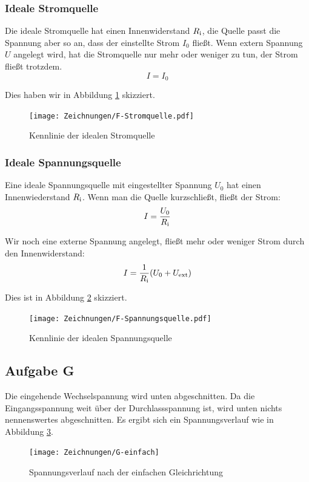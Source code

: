 \subsubsection{Ideale Stromquelle}

Die ideale Stromquelle hat einen Innenwiderstand $R_\text i$, die Quelle passt
die Spannung aber so an, dass der einstellte Strom $I_0$ fließt. Wenn extern
Spannung $U$ angelegt wird, hat die Stromquelle nur mehr oder weniger zu tun,
der Strom fließt trotzdem.
\[
	I = I_0
\]

Dies haben wir in Abbildung \ref{fig:F-Stromquelle} skizziert.

\begin{figure}[h]
	\centering
	\caption{%
		Kennlinie der idealen Stromquelle
	}
	\label{fig:F-Stromquelle}
	\texttt{[image: Zeichnungen/F-Stromquelle.pdf]}
\end{figure}

\subsubsection{Ideale Spannungsquelle}

Eine ideale Spannungsquelle mit eingestellter Spannung $U_0$ hat einen
Innenwiederstand $R_\text i$. Wenn man die Quelle kurzschließt, fließt der
Strom:
\[
	I = \frac{U_0}{R_\text i}
\]

Wir noch eine externe Spannung angelegt, fließt mehr oder weniger Strom durch
den Innenwiderstand:
\[
	I = \frac{1}{R_\text i} (U_0 + U_\text{ext})
\]

Dies ist in Abbildung \ref{fig:F-Spannungsquelle} skizziert.

\begin{figure}[h]
	\centering
	\caption{%
		Kennlinie der idealen Spannungsquelle
	}
	\label{fig:F-Spannungsquelle}
	\texttt{[image: Zeichnungen/F-Spannungsquelle.pdf]}
\end{figure}

\subsection{Aufgabe G}

Die eingehende Wechselspannung wird unten abgeschnitten. Da die
Eingangsspannung weit über der Durchlassspannung ist, wird unten nichts
nennenswertes abgeschnitten. Es ergibt sich ein Spannungsverlauf wie in
Abbildung \ref{fig:G-einfach}.

\begin{figure}[h]
	\centering
	\caption{%
		Spannungsverlauf nach der einfachen Gleichrichtung
	}
	\label{fig:G-einfach}
	\texttt{[image: Zeichnungen/G-einfach]}
\end{figure}

